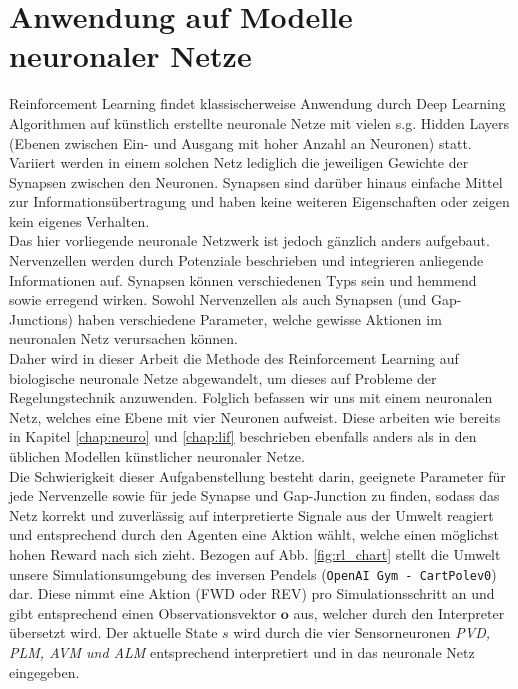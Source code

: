 \section{Anwendung auf Modelle neuronaler Netze}
\label{sec:rl_neuro}
	Reinforcement Learning findet klassischerweise Anwendung durch Deep Learning Algorithmen auf künstlich erstellte neuronale Netze mit vielen s.g. \grqq Hidden Layers\glqq{} (Ebenen zwischen Ein- und Ausgang mit hoher Anzahl an Neuronen) statt. Variiert werden in einem solchen Netz lediglich die jeweiligen Gewichte der Synapsen zwischen den Neuronen. Synapsen sind darüber hinaus einfache Mittel zur Informationsübertragung und haben keine weiteren Eigenschaften oder zeigen kein eigenes Verhalten.\\
	Das hier vorliegende neuronale Netzwerk ist jedoch gänzlich anders aufgebaut. Nervenzellen werden durch Potenziale beschrieben und integrieren anliegende Informationen auf. Synapsen können verschiedenen Typs sein und hemmend sowie erregend wirken. Sowohl Nervenzellen als auch Synapsen (und Gap-Junctions) haben verschiedene Parameter, welche gewisse Aktionen im neuronalen Netz verursachen können.\\
	Daher wird in dieser Arbeit die Methode des Reinforcement Learning auf biologische neuronale Netze abgewandelt, um dieses auf Probleme der Regelungstechnik anzuwenden. Folglich befassen wir uns mit einem neuronalen Netz, welches eine Ebene mit vier Neuronen aufweist. Diese  arbeiten wie bereits in Kapitel \ref{chap:neuro} und \ref{chap:lif} beschrieben ebenfalls anders als in den üblichen Modellen künstlicher neuronaler Netze.\\
	Die Schwierigkeit dieser Aufgabenstellung besteht darin, geeignete Parameter für jede Nervenzelle sowie für jede Synapse und Gap-Junction zu finden, sodass das Netz korrekt und zuverlässig auf interpretierte Signale aus der Umwelt reagiert und entsprechend durch den Agenten eine Aktion wählt, welche einen möglichst hohen Reward nach sich zieht. Bezogen auf Abb. \ref{fig:rl_chart} stellt die Umwelt unsere Simulationsumgebung des inversen Pendels (\texttt{OpenAI Gym - CartPolev0}) dar. Diese nimmt eine Aktion (FWD oder REV) pro Simulationsschritt an und gibt entsprechend einen Observationsvektor $\textbf{o}$ aus, welcher durch den Interpreter übersetzt wird. Der aktuelle State $s$ wird durch die vier Sensorneuronen \textit{PVD, PLM, AVM und ALM} entsprechend interpretiert und in das neuronale Netz eingegeben.

